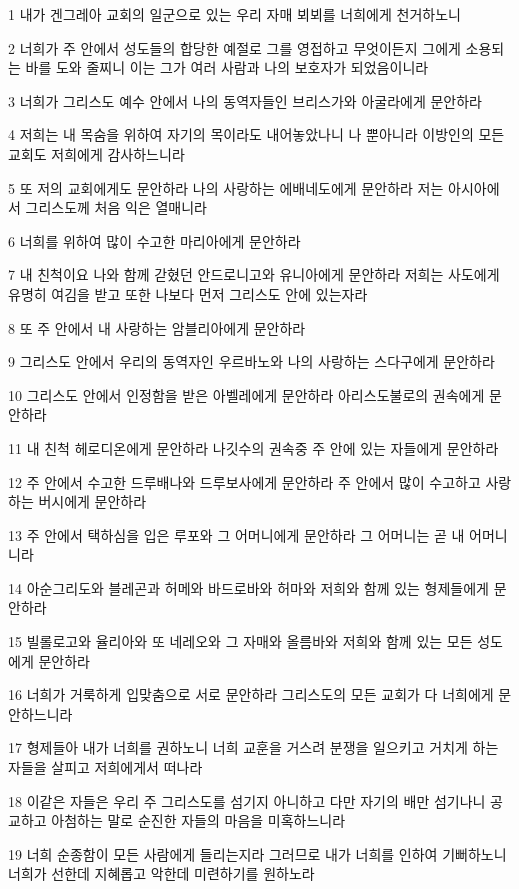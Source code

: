 \par 1 내가 겐그레아 교회의 일군으로 있는 우리 자매 뵈뵈를 너희에게 천거하노니
\par 2 너희가 주 안에서 성도들의 합당한 예절로 그를 영접하고 무엇이든지 그에게 소용되는 바를 도와 줄찌니 이는 그가 여러 사람과 나의 보호자가 되었음이니라
\par 3 너희가 그리스도 예수 안에서 나의 동역자들인 브리스가와 아굴라에게 문안하라
\par 4 저희는 내 목숨을 위하여 자기의 목이라도 내어놓았나니 나 뿐아니라 이방인의 모든 교회도 저희에게 감사하느니라
\par 5 또 저의 교회에게도 문안하라 나의 사랑하는 에배네도에게 문안하라 저는 아시아에서 그리스도께 처음 익은 열매니라
\par 6 너희를 위하여 많이 수고한 마리아에게 문안하라
\par 7 내 친척이요 나와 함께 갇혔던 안드로니고와 유니아에게 문안하라 저희는 사도에게 유명히 여김을 받고 또한 나보다 먼저 그리스도 안에 있는자라
\par 8 또 주 안에서 내 사랑하는 암블리아에게 문안하라
\par 9 그리스도 안에서 우리의 동역자인 우르바노와 나의 사랑하는 스다구에게 문안하라
\par 10 그리스도 안에서 인정함을 받은 아벨레에게 문안하라 아리스도불로의 권속에게 문안하라
\par 11 내 친척 헤로디온에게 문안하라 나깃수의 권속중 주 안에 있는 자들에게 문안하라
\par 12 주 안에서 수고한 드루배나와 드루보사에게 문안하라 주 안에서 많이 수고하고 사랑하는 버시에게 문안하라
\par 13 주 안에서 택하심을 입은 루포와 그 어머니에게 문안하라 그 어머니는 곧 내 어머니니라
\par 14 아순그리도와 블레곤과 허메와 바드로바와 허마와 저희와 함께 있는 형제들에게 문안하라
\par 15 빌롤로고와 율리아와 또 네레오와 그 자매와 올름바와 저희와 함께 있는 모든 성도에게 문안하라
\par 16 너희가 거룩하게 입맞춤으로 서로 문안하라 그리스도의 모든 교회가 다 너희에게 문안하느니라
\par 17 형제들아 내가 너희를 권하노니 너희 교훈을 거스려 분쟁을 일으키고 거치게 하는 자들을 살피고 저희에게서 떠나라
\par 18 이같은 자들은 우리 주 그리스도를 섬기지 아니하고 다만 자기의 배만 섬기나니 공교하고 아첨하는 말로 순진한 자들의 마음을 미혹하느니라
\par 19 너희 순종함이 모든 사람에게 들리는지라 그러므로 내가 너희를 인하여 기뻐하노니 너희가 선한데 지혜롭고 악한데 미련하기를 원하노라
